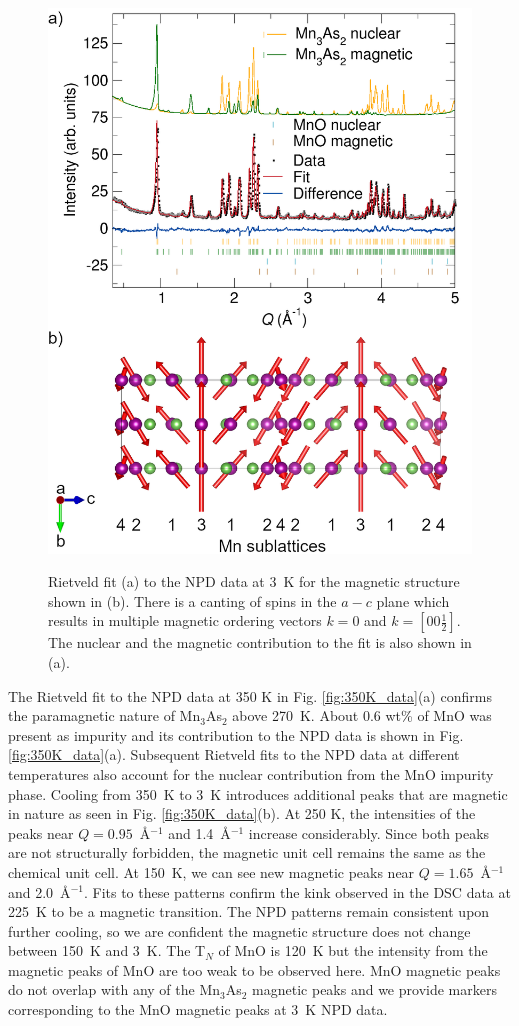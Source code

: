 \documentclass[10pt,doublespacing,edeposit]{uiucthesis2020}
\begin{document}
\begin{mainmatter}
\begin{figure}
\centering\includegraphics[width=0.75\columnwidth]{figures/ch6/3K_mag_structure.png} \\
\caption{Rietveld fit (a) to the NPD data at 3~K for the magnetic structure shown in (b). There is a canting of spins in the $a-c$ plane which results in multiple magnetic ordering vectors $k = 0$ and $k = [00\frac{1}{2}]$. The nuclear and the magnetic contribution to the fit is also shown in (a). 
}
\label{fig:3K_data}
\end{figure}


The Rietveld fit to the NPD data at 350 K in Fig. \ref{fig:350K_data}(a) confirms the paramagnetic nature of Mn$_3$As$_2$ above 270~K. About 0.6 wt\% of MnO was present as impurity and its contribution to the NPD data is shown in Fig. \ref{fig:350K_data}(a). Subsequent Rietveld fits to the NPD data at different temperatures also account for the nuclear contribution from the MnO impurity phase. Cooling from 350~K to 3~K introduces additional peaks that are magnetic in nature as seen in Fig. \ref{fig:350K_data}(b).
At 250 K, the intensities of the peaks near $Q = 0.95$~\AA$^{-1}$ and 1.4~\AA$^{-1}$ increase considerably. Since both peaks are not structurally forbidden, the magnetic unit cell remains the same as the chemical unit cell.
At 150~K, we can see new magnetic peaks near $Q = 1.65$~\AA$^{-1}$ and 2.0~\AA$^{-1}$. Fits to these patterns confirm the kink observed in the DSC data at 225~K to be a magnetic transition. The NPD patterns remain consistent upon further cooling, so we are confident the magnetic structure does not change between 150~K and 3~K. The T$_N$ of MnO is 120~K but the intensity from the magnetic peaks of MnO are too weak to be observed here. MnO magnetic peaks do not overlap with any of the Mn$_3$As$_2$ magnetic peaks and we provide markers corresponding to the MnO magnetic peaks at 3~K NPD data.




\end{mainmatter}
\end{document}
